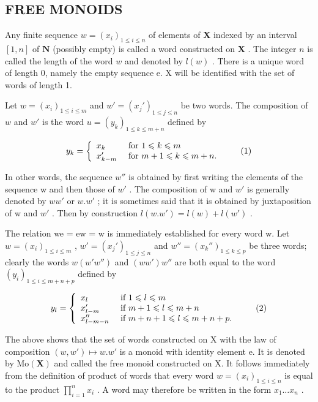 \subsection{FREE MONOIDS}

Any finite sequence \(w = (x_{i})_{1 \leqslant i \leqslant n}\) of elements of \(\mathbf{X}\) indexed by an interval \([1, n]\) of \(\mathbf{N}\) (possibly empty) is called a word constructed on \(\mathbf{X}\) . The integer \(n\) is called the length of the word \(w\) and denoted by \(l(w)\) . There is a unique word of length 0, namely the empty sequence e. X will be identified with the set of words of length 1.

Let \(w = (x_{i})_{1 \leqslant i \leqslant m}\) and \(w' = (x_{j}')_{1 \leqslant j \leqslant n}\) be two words. The composition of \(w\) and \(w'\) is the word \(u = (y_{k})_{1 \leqslant k \leqslant m + n}\) defined by

\[
y _ {k} = \left\{ \begin{array}{l l} x _ {k} & \text { for } 1 \leqslant k \leqslant m \\ x _ {k - m} ^ {\prime} & \text { for } m + 1 \leqslant k \leqslant m + n. \end{array} \right.\tag{1}
\]

In other words, the sequence \(w''\) is obtained by first writing the elements of the sequence w and then those of \(w'\) . The composition of w and \(w'\) is generally denoted by \(ww'\) or \(w.w'\) ; it is sometimes said that it is obtained by juxtaposition of w and \(w'\) . Then by construction \(l(w.w') = l(w) + l(w')\) .

The relation we = ew = w is immediately established for every word w. Let \(w = (x_{i})_{1 \leqslant i \leqslant m}\) , \(w' = (x_{j}')_{1 \leqslant j \leqslant n}\) and \(w'' = (x_{k}'')_{1 \leqslant k \leqslant p}\) be three words; clearly the words \(w(w'w'')\) and \((ww')w''\) are both equal to the word \((y_{i})_{1 \leqslant i \leqslant m+n+p}\) defined by

\[
y _ {l} = \left\{ \begin{array}{l l} x _ {l} & \text { if } 1 \leqslant l \leqslant m \\ x _ {l - m} ^ {\prime} & \text { if } m + 1 \leqslant l \leqslant m + n \\ x _ {l - m - n} ^ {\prime \prime} & \text { if } m + n + 1 \leqslant l \leqslant m + n + p. \end{array} \right.\tag{2}
\]

The above shows that the set of words constructed on X with the law of composition \((w, w') \mapsto w.w'\) is a monoid with identity element e. It is denoted by \(\mathrm{Mo}(\mathbf{X})\) and called the free monoid constructed on X. It follows immediately from the definition of product of words that every word \(w = (x_i)_{1 \leq i \leq n}\) is equal to the product \(\prod_{i=1}^{n} x_i\) . A word may therefore be written in the form \(x_1 \ldots x_{n}\) .

